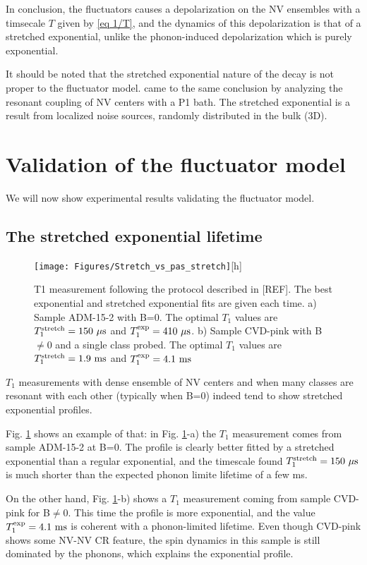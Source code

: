 \documentclass[a4paper,11pt]{report}
\begin{document}
In conclusion, the fluctuators causes a depolarization on the NV ensembles with a timsecale $T$ given by \ref{eq 1/T}, and the dynamics of this depolarization is that of a stretched exponential, unlike the phonon-induced depolarization which is purely exponential.

It should be noted that the stretched exponential nature of the decay is not proper to the fluctuator model. \citep{hall2016detection} came to the same conclusion by analyzing the resonant coupling of NV centers with a P1 bath. The stretched exponential is a result from localized noise sources, randomly distributed in the bulk (3D).

\section{Validation of the fluctuator model}
We will now show experimental results validating the fluctuator model.
\subsection{The stretched exponential lifetime}
\begin{figure}[h]
\centering
\texttt{[image: Figures/Stretch\_vs\_pas\_stretch]}[h]
\label{stretch_or_not_stretch}
\caption{T1 measurement following the protocol described in [REF]. The best exponential and stretched exponential fits are given each time. a) Sample ADM-15-2 with B=0. The optimal $T_1$ values are $T_1^{\rm stretch}=150\ \mu \rm s$ and $T_1^{\rm exp}=410\ \mu \rm s$. b) Sample CVD-pink with B$\neq$0 and a single class probed. The optimal $T_1$ values are $T_1^{\rm stretch}=1.9\ \rm ms$ and $T_1^{\rm exp}=4.1\ \rm ms$}
\end{figure}
$T_1$ measurements with dense ensemble of NV centers and when many classes are resonant with each other (typically when B=0) indeed tend to show stretched exponential profiles.

Fig. \ref{stretch_or_not_stretch} shows an example of that: in Fig. \ref{stretch_or_not_stretch}-a) the $T_1$ measurement comes from sample ADM-15-2 at B=0. The profile is clearly better fitted by a stretched exponential than a regular exponential, and the timescale found $T_1^{\rm stretch}=150\ \mu \rm s$ is much shorter than the expected phonon limite lifetime of a few ms.

On the other hand, Fig. \ref{stretch_or_not_stretch}-b) shows a $T_1$ measurement coming from sample CVD-pink for B$\neq$0. This time the profile is more exponential, and the value $T_1^{\rm exp}=4.1\ \rm ms$ is coherent with a phonon-limited lifetime. Even though CVD-pink shows some NV-NV CR feature, the spin dynamics in this sample is still dominated by the phonons, which explains the exponential profile.
\end{document}
